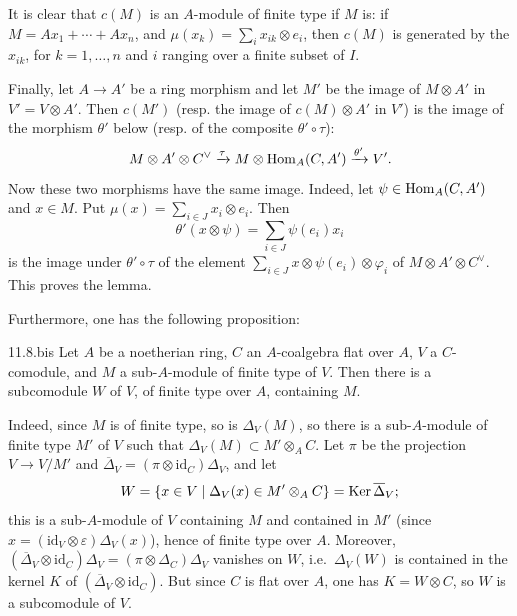 It is clear that $c(M)$ is an $A$-module of finite type if $M$ is: if $M=Ax_1+\cdots+Ax_n$, and $\mu(x_k)=\sum_i x_{ik}\otimes e_i$, then $c(M)$ is generated by the $x_{ik}$, for $k=1,\ldots,n$ and $i$ ranging over a finite subset of $I$.

Finally, let $A\to A'$ be a ring morphism and let $M'$ be the image of $M\otimes A'$ in $V'=V\otimes A'$. Then $c(M')$ (resp. the image of $c(M)\otimes A'$ in $V'$) is the image of the morphism $\theta'$ below (resp. of the composite $\theta'\circ\tau$):
\[
M\otimes A'\otimes C^\vee\xrightarrow{\tau}M\otimes\operatorname{Hom}_A(C,A')\xrightarrow{\theta'}V'.
\]
Now these two morphisms have the same image. Indeed, let $\psi\in\operatorname{Hom}_A(C,A')$ and $x\in M$. Put $\mu(x)=\sum_{i\in J}x_i\otimes e_i$. Then
\[
\theta'(x\otimes\psi)=\sum_{i\in J}\psi(e_i)x_i
\]
is the image under $\theta'\circ\tau$ of the element $\sum_{i\in J}x\otimes\psi(e_i)\otimes\varphi_i$ of $M\otimes A'\otimes C^\vee$. This proves the lemma.

Furthermore, one has the following proposition:
\begin{proposition}{11.8.bis}\label{VIB.11.8.bis}
Let $A$ be a noetherian ring, $C$ an $A$-coalgebra flat over $A$, $V$ a $C$-comodule, and $M$ a sub-$A$-module of finite type of $V$. Then there is a subcomodule $W$ of $V$, of finite type over $A$, containing $M$.
\end{proposition}
Indeed, since $M$ is of finite type, so is $\Delta_V(M)$, so there is a sub-$A$-module of finite type $M'$ of $V$ such that $\Delta_V(M)\subset M'\otimes_A C$. Let $\pi$ be the projection $V\to V/M'$ and $\overline\Delta_V=(\pi\otimes\mathrm{id}_C)\Delta_V$, and let
\[
W=\{x\in V\mid\Delta_V(x)\in M'\otimes_A C\}=\operatorname{Ker}\overline\Delta_V;
\]
this is a sub-$A$-module of $V$ containing $M$ and contained in $M'$ (since $x=(\mathrm{id}_V\otimes\varepsilon)\Delta_V(x)$), hence of finite type over $A$. Moreover, $(\overline\Delta_V\otimes\mathrm{id}_C)\Delta_V=(\pi\otimes\Delta_C)\Delta_V$ vanishes on $W$, i.e.\ $\Delta_V(W)$ is contained in the kernel $K$ of $(\overline\Delta_V\otimes\mathrm{id}_C)$. But since $C$ is flat over $A$, one has $K=W\otimes C$, so $W$ is a subcomodule of $V$.

